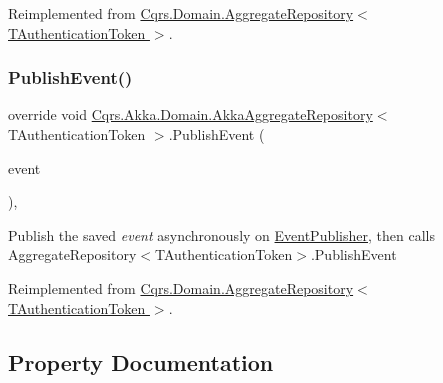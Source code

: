 Reimplemented from \hyperlink{classCqrs_1_1Domain_1_1AggregateRepository_a64d82c57bbe49a11bd5cf20c5b86ce19_a64d82c57bbe49a11bd5cf20c5b86ce19}{Cqrs.\+Domain.\+Aggregate\+Repository$<$ T\+Authentication\+Token $>$}.

\mbox{\label{classCqrs_1_1Akka_1_1Domain_1_1AkkaAggregateRepository_a144cbfdedb23039729ba5b3058f84e7a_a144cbfdedb23039729ba5b3058f84e7a}} 
\subsubsection{\texorpdfstring{Publish\+Event()}{PublishEvent()}}
{\footnotesize\ttfamily override void \hyperlink{classCqrs_1_1Akka_1_1Domain_1_1AkkaAggregateRepository}{Cqrs.\+Akka.\+Domain.\+Akka\+Aggregate\+Repository}$<$ T\+Authentication\+Token $>$.Publish\+Event (\begin{DoxyParamCaption}\item[{\hyperlink{interfaceCqrs_1_1Events_1_1IEvent}{I\+Event}$<$ T\+Authentication\+Token $>$ @}]{event }\end{DoxyParamCaption})\hspace{0.3cm}{\ttfamily [protected]}, {\ttfamily [virtual]}}



Publish the saved {\itshape event}  asynchronously on \hyperlink{classCqrs_1_1Akka_1_1Domain_1_1AkkaAggregateRepository_a6c6400aef33fd3ec5dc3e479ebec6b40_a6c6400aef33fd3ec5dc3e479ebec6b40}{Event\+Publisher}, then calls Aggregate\+Repository$<$\+T\+Authentication\+Token$>$.\+Publish\+Event 



Reimplemented from \hyperlink{classCqrs_1_1Domain_1_1AggregateRepository_a3191ba3d6fa4f6b904128c4731262944_a3191ba3d6fa4f6b904128c4731262944}{Cqrs.\+Domain.\+Aggregate\+Repository$<$ T\+Authentication\+Token $>$}.



\subsection{Property Documentation}
\mbox{\label{classCqrs_1_1Akka_1_1Domain_1_1AkkaAggregateRepository_a6c6400aef33fd3ec5dc3e479ebec6b40_a6c6400aef33fd3ec5dc3e479ebec6b40}} 
